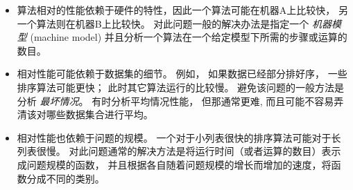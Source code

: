 \begin{itemize}


\item 算法相对的性能依赖于硬件的特性，因此一个算法可能在机器A上比较快， 另一个算法则在机器B上比较快。
对此问题一般的解决办法是指定一个 {\em 机器模型} (machine model) 并且分析一个算法在一个给定模型下所需的步骤或运算的数目。
 


\item 相对性能可能依赖于数据集的细节。
例如， 如果数据已经部分排好序， 一些排序算法可能更快； 此时其它算法运行的比较慢。
避免该问题的一般方法是分析 {\em 最坏情况}。
有时分析平均情况性能， 但那通常更难, 而且可能不容易弄清该对哪些数据集合进行平均。
  


\item 相对性能也依赖于问题的规模。
一个对于小列表很快的排序算法可能对于长列表很慢。
对此问题通常的解决方法是将运行时间（或者运算的数目）表示成问题规模的函数， 并且根据各自随着问题规模的增长而增加的速度，将函数分成不同的类别。
\end{itemize}

